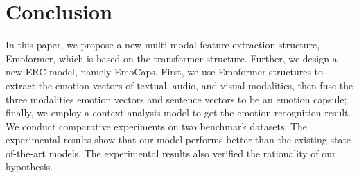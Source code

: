 \documentclass[11pt]{article}
\begin{document}
\section{Conclusion}
In this paper, we propose a new multi-modal feature extraction structure, Emoformer, which is based on the transformer structure. Further, we design a new ERC model, namely EmoCaps. First, we use Emoformer structures to extract the emotion vectors of textual, audio, and visual modalities, then fuse the three modalities emotion vectors and sentence vectors to be an emotion capsule; finally, we employ a context analysis model to get the emotion recognition result. We conduct comparative experiments on two benchmark datasets. The experimental results show that our model performs better than the existing state-of-the-art models. The experimental results also verified the rationality of our hypothesis.


\end{document}
